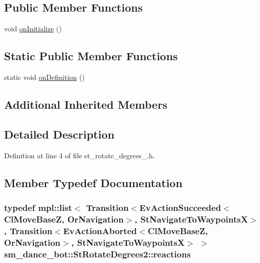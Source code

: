 \subsection*{Public Member Functions}
\begin{DoxyCompactItemize}
\item 
void \hyperlink{structsm__dance__bot_1_1StRotateDegrees2_af85e79274e57e0a4ccf50845bac9edc9}{on\+Initialize} ()
\end{DoxyCompactItemize}
\subsection*{Static Public Member Functions}
\begin{DoxyCompactItemize}
\item 
static void \hyperlink{structsm__dance__bot_1_1StRotateDegrees2_aebb0e8217cca3669331f049a1382ea4e}{on\+Definition} ()
\end{DoxyCompactItemize}
\subsection*{Additional Inherited Members}


\subsection{Detailed Description}


Definition at line 4 of file st\+\_\+rotate\+\_\+degrees\+\_.\+h.



\subsection{Member Typedef Documentation}
\subsubsection[{\texorpdfstring{reactions}{reactions}}]{\setlength{\rightskip}{0pt plus 5cm}typedef mpl\+::list$<$ Transition$<$Ev\+Action\+Succeeded$<${\bf Cl\+Move\+BaseZ}, {\bf Or\+Navigation}$>$, {\bf St\+Navigate\+To\+WaypointsX}$>$, Transition$<$Ev\+Action\+Aborted$<${\bf Cl\+Move\+BaseZ}, {\bf Or\+Navigation}$>$, {\bf St\+Navigate\+To\+WaypointsX}$>$ $>$ {\bf sm\+\_\+dance\+\_\+bot\+::\+St\+Rotate\+Degrees2\+::reactions}}\hypertarget{structsm__dance__bot_1_1StRotateDegrees2_ac78a9a21e3b11060f12b8403669e3dda}{}\label{structsm__dance__bot_1_1StRotateDegrees2_ac78a9a21e3b11060f12b8403669e3dda}


